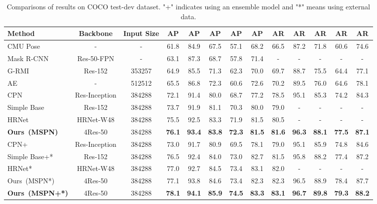 \documentclass[10pt,twocolumn,letterpaper]{article}
\begin{document}
\begin{table*}[t]
	\begin{spacing}{1.05}
		\begin{center}
			\renewcommand\tabcolsep{4.0pt}
			\begin{tabular}{l|c|c|c c c c c c c c c c}
				\hline
				Method & Backbone & Input Size & AP & AP & AP & AP & AP & AR & AR & AR & AR & AR\\
				\hline
				CMU Pose~\cite{cao2016realtime} & - & - & 61.8 & 84.9 & 67.5 & 57.1 & 68.2 & 66.5 & 87.2 & 71.8 & 60.6 & 74.6\\
				Mask R-CNN~\cite{he2017mask} & Res-50-FPN & - & 63.1 & 87.3 & 68.7 & 57.8 & 71.4 & - & - & - & - & -\\
				G-RMI~\cite{papandreou2017towards} & Res-152 & 353257 & 64.9 & 85.5 & 71.3 & 62.3 & 70.0 & 69.7 & 88.7 & 75.5 & 64.4 & 77.1\\
				AE~\cite{newell2017associative} & - & 512512 & 65.5 & 86.8 & 72.3 & 60.6 & 72.6 & 70.2 & 89.5 & 76.0 & 64.6 & 78.1\\
				CPN~\cite{chen2018cascaded} & Res-Inception & 384288 & 72.1 & 91.4 & 80.0 & 68.7 & 77.2 & 78.5 & 95.1 & 85.3 & 74.2 & 84.3\\
				Simple Base~\cite{xiao2018simple} & Res-152 & 384288 & 73.7 & 91.9 & 81.1 & 70.3 & 80.0 & 79.0 & - & - & - & -\\
				HRNet ~\cite{sun2019deep} & HRNet-W48 & 384288 & 75.5 & 92.5 & 83.3 & 71.9 & 81.5 & 80.5 & - & - & - & - \\
				\textbf{Ours~(MSPN)} & 4Res-50 & 384288 & \textbf{76.1} & \textbf{93.4} & \textbf{83.8} & \textbf{72.3} & \textbf{81.5} & \textbf{81.6} & \textbf{96.3} & \textbf{88.1} & \textbf{77.5} & \textbf{87.1}\\
				\hline
				CPN+~\cite{chen2018cascaded} & Res-Inception & 384288 & 73.0 & 91.7 & 80.9 & 69.5 & 78.1 & 79.0 & 95.1 & 85.9 & 74.8 & 84.6\\
				Simple Base+*~\cite{xiao2018simple} & Res-152 & 384288 & 76.5 & 92.4 & 84.0 & 73.0 & 82.7 & 81.5 & 95.8 & 88.2 & 77.4 & 87.2\\
				HRNet* ~\cite{sun2019deep} & HRNet-W48 & 384288 & 77.0 & 92.7 & 84.5 & 73.4 & 83.1 & 82.0 & - & - & - & - \\
				Ours~(MSPN*) & 4Res-50 & 384288 & 77.1 & 93.8 & 84.6 & 73.4 & 82.3 & 82.3 & 96.5 & 88.9 & 78.4 & 87.7\\
				\textbf{Ours~(MSPN+*)} & 4Res-50 & 384288 & \textbf{78.1} & \textbf{94.1} & \textbf{85.9} & \textbf{74.5} & \textbf{83.3} & \textbf{83.1} & \textbf{96.7} & \textbf{89.8} & \textbf{79.3} & \textbf{88.2}\\ 
				\hline
			\end{tabular}
		\end{center}
		\caption{Comparisons of results on COCO test-dev dataset. "+" indicates using an ensemble model and "*" means using external data.}
		\label{tab:test-dev}
	\end{spacing}
\end{table*}
\end{document}

